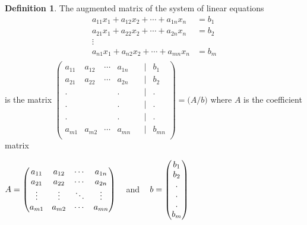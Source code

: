 \documentclass[11pt,a4paper]{article}
\theoremstyle{definition}
\newtheorem{defn}[thm]{Definition}
\begin{document}
\begin{defn}
The augmented matrix of the system of linear equations
\begin{align*}
a_{11}x_1+a_{12}x_2+\cdots+a_{1n}x_n &=b_1\\
a_{21}x_1+a_{22}x_2+\cdots+a_{2n}x_n &=b_2\\
\vdots\\
a_{n1}x_1+a_{n2}x_2+\cdots+a_{mn}x_n&=b_m\\
\end{align*}
is the matrix
$
\begin{pmatrix}
a_{11}&a_{12}&\cdots&a_{1n}&&|&b_1\\
a_{21}&a_{22}&\cdots&a_{2n}&&|&b_2\\
.&&&.&&|&.\\
.&&&.&&|&.\\
.&&&.&&|&.\\
a_{m1}&a_{m2}&\cdots&a_{mn}&&|&b_{mn}\\
\end{pmatrix}
=\Big(A/b\Big)$ where $A$ is the coefficient matrix

$
A=
\begin{pmatrix}
a_{11}&a_{12}&\cdots&a_{1n}\\
a_{21}&a_{22}&\cdots&a_{2n}\\
\vdots&\vdots&\ddots&\vdots\\
a_{m1}&a_{m2}&\cdots&a_{mn}\\
\end{pmatrix}
\hspace{0.3cm}$
and 
$\hspace{0.3cm}
b=
\begin{pmatrix}
b_1\\b_2\\.\\.\\.\\b_m\\
\end{pmatrix}
$
\end{defn}
\end{document}
